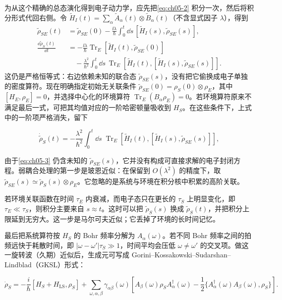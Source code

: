 为从这个精确的总态演化得到电子动力学，应先把\cref{eq:ch05-2} 积分一次，然后将积分形式代回右侧。令 $\widetilde H_I(t)=\sum_\alpha\widetilde A_\alpha(t)\otimes\widetilde B_\alpha(t)$（不含显式因子 $\lambda$），得到
\begin{align*}
\widetilde\rho_{SE}(t)
&=\widetilde\rho_{SE}(0)
-\frac{\ii\lambda}{\hbar}\int_0^t\dd s\,
[\widetilde H_I(s),\widetilde\rho_{SE}(s)],\\
\frac{\dd\widetilde\rho_S(t)}{\dd t}
&=-\frac{\ii\lambda}{\hbar}\operatorname{Tr}_E
[\widetilde H_I(t),\widetilde\rho_{SE}(0)]\\
&\quad-\frac{\lambda^2}{\hbar^2}\int_0^t\dd s\,
\operatorname{Tr}_E[\widetilde H_I(t),
[\widetilde H_I(s),\widetilde\rho_{SE}(s)]].
\end{align*}
这仍是严格恒等式：右边依赖未知的联合态 $\widetilde\rho_{SE}(s)$，没有把它偷换成电子单独的密度算符。现在明确指定初始无关联条件
$\widetilde\rho_{SE}(0)=\rho_S(0)\otimes\rho_E$，其中
$[H_E,\rho_E]=0$，并选择中心化的环境算符
$\operatorname{Tr}_E(B_\alpha\rho_E)=0$。若环境算符原来不满足最后一式，可把其均值对应的一阶哈密顿量吸收到 $H_S$。在这些条件下，上式中的一阶项严格消失，留下

\begin{equation}
\dot{\widetilde\rho}_S(t)=-\frac{\lambda^2}{\hbar^2}\int_0^t \dd s\;\operatorname{Tr}_E\!\left[\widetilde H_I(t),[\widetilde H_I(s),\widetilde\rho_{SE}(s)]\right],
\label{eq:ch05-3}
\end{equation}

由于\cref{eq:ch05-3} 仍含未知的 $\widetilde\rho_{SE}(s)$，它并没有构成可直接求解的电子封闭方程。弱耦合处理的第一步是玻恩近似：在保留到 $O(\lambda^2)$ 的精度下，取 $\widetilde\rho_{SE}(s)\simeq\widetilde\rho_S(s)\otimes\rho_E$。它忽略的是系统与环境在积分核中积累的高阶关联。

若环境关联函数在时间 $\tau_E$ 内衰减，而电子态只在更长的 $\tau_S$ 上明显变化，即 $\tau_E\ll\tau_S$，则积分主要来自 $s\approx t$。这时可以把 $\widetilde\rho_S(s)$ 换成 $\widetilde\rho_S(t)$，并把积分上限延到无穷大。这一步是马尔可夫近似；它丢掉了环境的长时间记忆。

最后把系统算符按 $H_S$ 的 Bohr 频率分解为 $A_\alpha(\omega)$。若不同 Bohr 频率之间的拍频远快于耗散时间，即 $|\omega-\omega'|\tau_S\gg1$，时间平均会压低 $\omega\ne\omega'$ 的交叉项。做这一旋转波（久期）近似后，生成元可写成 Gorini--Kossakowski--Sudarshan--Lindblad（GKSL）形式：

\begin{equation}
\dot\rho_S=-\frac{i}{\hbar}[H_S+H_{\mathrm{LS}},\rho_S]+\sum_{\omega,\alpha,\beta}\gamma_{\alpha\beta}(\omega)\left[A_\beta(\omega)\rho_S A_\alpha^\dagger(\omega)-\frac12\{A_\alpha^\dagger(\omega)A_\beta(\omega),\rho_S\}\right].
\label{eq:ch05-4}
\end{equation}

